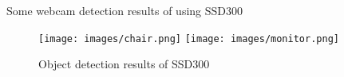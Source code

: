 \documentclass{article}
\begin{document}
\section{}
Some webcam detection results of using SSD300 \\
\begin{figure}[H]
\centering
{}
  \texttt{[image: images/chair.png]}
\endminipage \hspace{0.05\textwidth}
  \texttt{[image: images/monitor.png]}
\endminipage
\caption{Object detection results of SSD300}
\end{figure}
\end{document}
